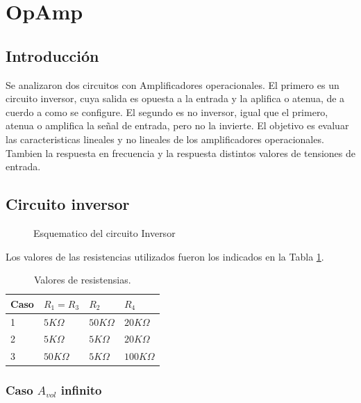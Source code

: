 \documentclass[../../main.tex]{subfiles}
\begin{document}
\section{OpAmp}
\subsection{Introducci\'on}
Se analizaron dos circuitos con Amplificadores operacionales. El primero es un circuito inversor, cuya salida es opuesta a la entrada y  la aplifica o atenua, de a cuerdo a como se configure. El segundo es no inversor, igual que el primero, atenua o amplifica la señal de entrada, pero no la invierte.
El objetivo es evaluar las caracteristicas lineales y no lineales de los amplificadores operacionales. Tambien la respuesta en frecuencia y la respuesta  distintos valores de tensiones de entrada.


\subsection{Circuito inversor}


\begin{figure}[H]
\centering



\caption{Esquematico del circuito Inversor}
\end{figure}

Los valores de las resistencias utilizados fueron los indicados en la Tabla \ref{tab=vResistencias}.

\begin{table}[h]
\begin{center}
\begin{tabular}{|l|l|l|l|}
\hline
Caso & $R_{1}=R_{3}$ & $R_{2}$ & $R_{4}$\\
\hline \hline
1 & $5 K\Omega $ &  $50 K\Omega $ &  $20 K\Omega $ \\ \hline
2 & $5 K\Omega $ &  $5 K\Omega $ &  $20 K\Omega $ \\ \hline
3 & $50 K\Omega $ &  $5 K\Omega $ &  $100 K\Omega $ \\ \hline
\end{tabular}
\caption{Valores de resistensias.} 
\label{tab=vResistencias}
\end{center}
\end{table}



\subsubsection{Caso $A_{vol}$ infinito}
\end{document}
